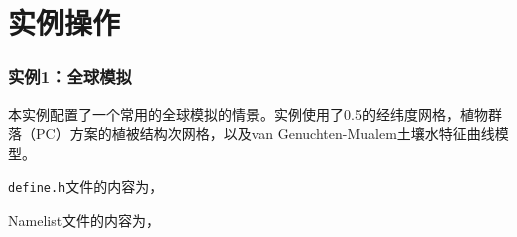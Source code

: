 \part{实例操作}

\section{实例1：全球模拟}

本实例配置了一个常用的全球模拟的情景。实例使用了0.5\textdegree 的经纬度网格，植物群落（PC）方案的植被结构次网格，以及van Genuchten-Mualem土壤水特征曲线模型。

\texttt{define.h}文件的内容为，


Namelist文件的内容为，


